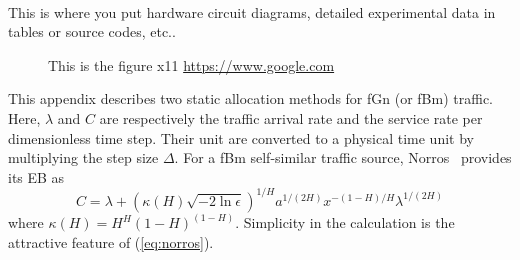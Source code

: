 \documentclass[12pt,oneside,openright,a4paper]{cpe-english-project}
\begin{document}


\makeatletter
\g@addto@macro{\UrlBreaks}{\UrlOrds}
\makeatother
% 




 \\

This is where you put hardware circuit diagrams, detailed experimental data in tables or source codes, etc.. \\ \bigskip

 \begin{figure}[!h]
\caption{This is the figure x11 \href{https://www.google.com} {https://www.google.com}}\label{fig:x1}
\end{figure}

This appendix describes two static allocation methods for fGn (or fBm)
traffic. Here, $\lambda$ and $C$ are respectively the traffic arrival
rate and the service rate per dimensionless time step. Their unit are
converted to a physical time unit by multiplying the step size
$\Delta$. For a fBm self-similar traffic source,
Norros~\cite{norros95} provides its EB as
\begin{equation}\label{eq:norros}
  C = \lambda + (\kappa(H)\sqrt{-2\ln\epsilon})^{1/H}a^{1/(2H)}x^{-(1-H)/H}\lambda^{1/(2H)}
\end{equation}
where $\kappa(H) = H^H(1-H)^{(1-H)}$. Simplicity in the calculation is
the attractive feature of (\ref{eq:norros}).
\end{document}
